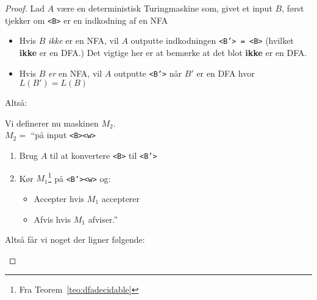\begin{proof}
  Lad $A$ være en deterministisk Turingmaskine som, givet et input $B$, først tjekker om \texttt{<B>} er en indkodning af en NFA
  \begin{itemize}
    \item Hvis $B$ \textit{ikke} er en NFA, vil $A$ outputte indkodningen \texttt{<B'> = <B>} (hvilket \textbf{ikke} er en DFA.) Det vigtige her er at bemærke at det blot \textbf{ikke} er en DFA.
    \item Hvis $B$ \textit{er} en NFA, vil $A$ outputte \texttt{<B'>} når $B'$ er en DFA hvor $L(B') = L(B)$
  \end{itemize}
  Altså:
  \begin{center}
  \end{center}

  Vi definerer nu maskinen $M_{2}$.\\
  \noindent
  $M_{2} = $ ``på input \texttt{<B><w>}
  \begin{enumerate}
    \item Brug $A$ til at konvertere \texttt{<B>} til \texttt{<B'>}
    \item Kør $M_{1}$\footnote{Fra Teorem~\ref{teo:dfadecidable}} på \texttt{<B'><w>} og:
          \begin{itemize}
            \item Accepter hvis $M_{1}$ accepterer
            \item Afvis hvis $M_{1}$ afviser.''
          \end{itemize}
  \end{enumerate}

  Altså får vi noget der ligner følgende:
  \begin{center}


\end{center}
\end{proof}
